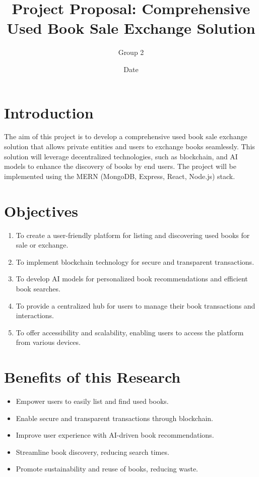 \documentclass{article}
\begin{document}
\title{Project Proposal: Comprehensive Used Book Sale Exchange Solution}
\author{Group 2}
\date{Date}
\maketitle

\tableofcontents
\newpage

\section{Introduction}
The aim of this project is to develop a comprehensive used book sale exchange solution that allows private entities and users to exchange books seamlessly. This solution will leverage decentralized technologies, such as blockchain, and AI models to enhance the discovery of books by end users. The project will be implemented using the MERN (MongoDB, Express, React, Node.js) stack.

\section{Objectives}
\begin{enumerate}[label=\arabic*.]
  \item To create a user-friendly platform for listing and discovering used books for sale or exchange.
  \item To implement blockchain technology for secure and transparent transactions.
  \item To develop AI models for personalized book recommendations and efficient book searches.
  \item To provide a centralized hub for users to manage their book transactions and interactions.
  \item To offer accessibility and scalability, enabling users to access the platform from various devices.
\end{enumerate}

\section{Benefits of this Research}
\begin{itemize}
  \item Empower users to easily list and find used books.
  \item Enable secure and transparent transactions through blockchain.
  \item Improve user experience with AI-driven book recommendations.
  \item Streamline book discovery, reducing search times.
  \item Promote sustainability and reuse of books, reducing waste.
\end{itemize}
\end{document}
